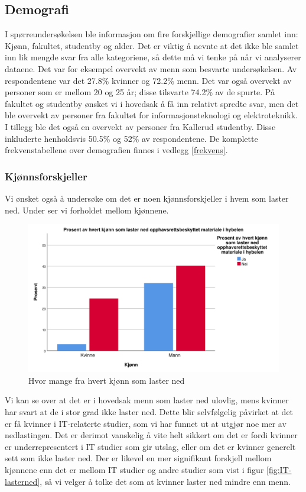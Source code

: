 \subsection{Demografi}
I spørreundersøkelsen ble informasjon om fire forskjellige demografier samlet inn: Kjønn, fakultet, studentby og alder. Det er viktig å nevnte at det ikke ble samlet inn lik mengde svar fra alle kategoriene, så dette må vi tenke på når vi analyserer dataene. Det var for eksempel overvekt av menn som besvarte undersøkelsen. Av respondentene var det 27.8\% kvinner og 72.2\% menn. Det var også overvekt av personer som er mellom 20 og 25 år; disse tilsvarte 74.2\% av de spurte. På fakultet og studentby ønsket vi i hovedsak å få inn relativt spredte svar, men det ble overvekt av personer fra fakultet for informasjonsteknologi og elektroteknikk. I tillegg ble det også en overvekt av personer fra Kallerud studentby. Disse inkluderte henholdsvis 50.5\% og 52\% av respondentene. De komplette frekvenstabellene over demografien finnes i vedlegg \ref{frekvens}. 

\subsubsection{Kjønnsforskjeller}
Vi ønsket også å undersøke om det er noen kjønnsforskjeller i hvem som laster ned. Under ser vi forholdet mellom kjønnene.
\begin{figure}[H]
    \centering
    \includegraphics[scale=0.45]{case_1/bilder/kjonn_lasterned.pdf}
    \caption[Kjønn laster ned]{Hvor mange fra hvert kjønn som laster ned}
    \label{fig:case1-kjønn_lasterned}
\end{figure}
Vi kan se over at det er i hovedsak menn som laster ned ulovlig, mens kvinner har svart at de i stor grad ikke laster ned. Dette blir selvfølgelig påvirket at det er få kvinner i IT-relaterte studier, som vi har funnet ut at utgjør noe mer av nedlastingen. Det er derimot vanskelig å vite helt sikkert om det er fordi kvinner er underrepresentert i IT studier som gir utslag, eller om det er kvinner generelt sett som ikke laster ned. Der er likevel en mer signifikant forskjell mellom kjønnene enn det er mellom IT studier og andre studier som vist i figur \ref{fig:IT-lasterned}, så vi velger å tolke det som at kvinner laster ned mindre enn menn.


